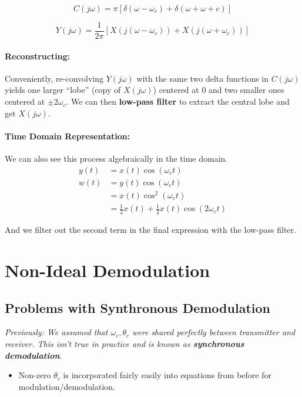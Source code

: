 \documentclass[a4paper,12pt]{report}
\begin{document}
\begin{equation}
C(j\omega) = \pi [\delta(\omega-\omega_c) + \delta(\omega+\omega+c)]
\end{equation}

\begin{equation}
Y(j\omega) = \frac{1}{2\pi} [X(j(\omega-\omega_c)) + X(j(\omega+\omega_c))]
\end{equation}

\paragraph{Reconstructing: } Conveniently, re-convolving $Y(j\omega)$ with the same two delta functions in $C(j\omega)$ yields one larger ``lobe'' (copy of $X(j\omega)$) centered at 0 and two smaller ones centered at $\pm 2\omega_c$. We can then \textbf{low-pass filter} to extract the central lobe and get $X(j\omega)$.

\paragraph{Time Domain Representation: } We can also see this process algebraically in the time domain.
\begin{align}
y(t) &= x(t)\cos(\omega_c t) \\
w(t) &= y(t)\cos(\omega_c t) \\
&= x(t) \cos^2 (\omega_c t) \\
&= \frac{1}{2} x(t) + \frac{1}{2} x(t) \cos(2\omega_c t)
\end{align}

And we filter out the second term in the final expression with the low-pass filter.

\section{Non-Ideal Demodulation}

\subsection{Problems with Synthronous Demodulation}

\textit{Previously: We assumed that $\omega_c, \theta_c$ were shared perfectly between transmitter and receiver. This isn't true in practice and is known as \textbf{synchronous demodulation}}.
\begin{itemize}
\item Non-zero $\theta_c$ is incorporated fairly easily into equations from before for modulation/demodulation.
\end{itemize}
\end{document}
